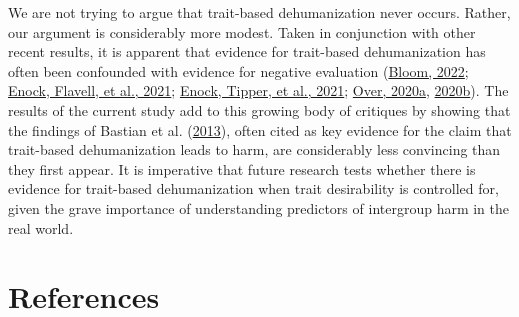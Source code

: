 \documentclass[
]{article}
\begin{document}
We are not trying to argue that trait-based dehumanization never occurs. Rather, our argument is considerably more modest. Taken in conjunction with other recent results, it is apparent that evidence for trait-based dehumanization has often been confounded with evidence for negative evaluation (\protect\hyperlink{ref-Bloom2022}{Bloom, 2022}; \protect\hyperlink{ref-Enock2021b}{Enock, Flavell, et al., 2021}; \protect\hyperlink{ref-Enock2021a}{Enock, Tipper, et al., 2021}; \protect\hyperlink{ref-Over2020a}{Over, 2020a}, \protect\hyperlink{ref-Over2020b}{2020b}). The results of the current study add to this growing body of critiques by showing that the findings of Bastian et al. (\protect\hyperlink{ref-Bastian2013}{2013}), often cited as key evidence for the claim that trait-based dehumanization leads to harm, are considerably less convincing than they first appear. It is imperative that future research tests whether there is evidence for trait-based dehumanization when trait desirability is controlled for, given the grave importance of understanding predictors of intergroup harm in the real world.

\hypertarget{references}{%
\section*{References}\label{references}}
\end{document}
